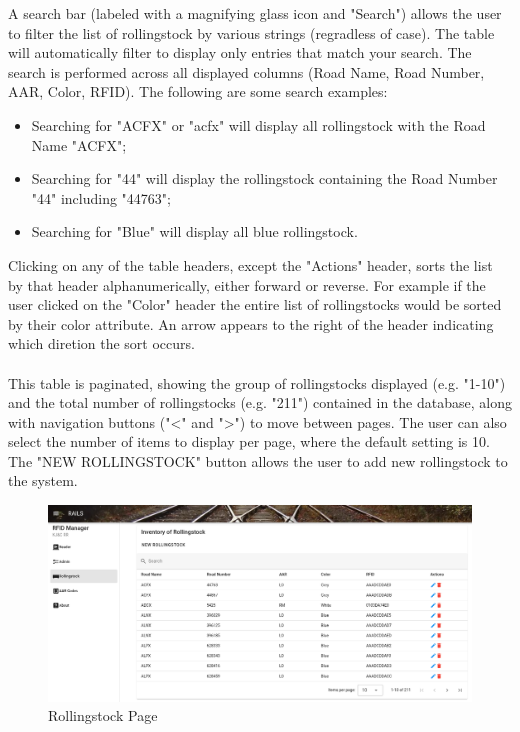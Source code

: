 A search bar (labeled with a magnifying glass icon and "Search") allows the user to filter the list of rollingstock by various strings (regradless of case). 
The table will automatically filter to display only entries that match your search. The search is performed across all displayed columns (Road Name, Road 
Number, AAR, Color, RFID). The following are some search examples:
\begin{itemize}
    \item Searching for "ACFX" or "acfx" will display all rollingstock with the Road Name "ACFX";
    \item Searching for "44" will display the rollingstock containing the Road Number "44" including "44763";
    \item Searching for "Blue" will display all blue rollingstock.
\end{itemize}
    
Clicking on any of the table headers, except the "Actions" header, sorts the list by that header alphanumerically, either forward or reverse. For example if 
the user clicked on the "Color" header the entire list of rollingstocks would be sorted by their color attribute. An arrow appears to the right of the 
header indicating which diretion the sort occurs.\\
\\
This table is paginated, showing the group of rollingstocks displayed (e.g. "1-10") and the total number of rollingstocks (e.g. "211") contained in the database, along 
with navigation buttons ("<" and ">") to move between pages. The user can also select the number of items to display per page, where the default setting is 10.
The "NEW ROLLINGSTOCK" button allows the user to add new rollingstock to the system.

\begin{figure}[H]
    \centering
    \includegraphics[scale=0.33]{./images/rs.png}
    \caption{Rollingstock Page}
    \label{fig:rollingstock1}
\end{figure}

